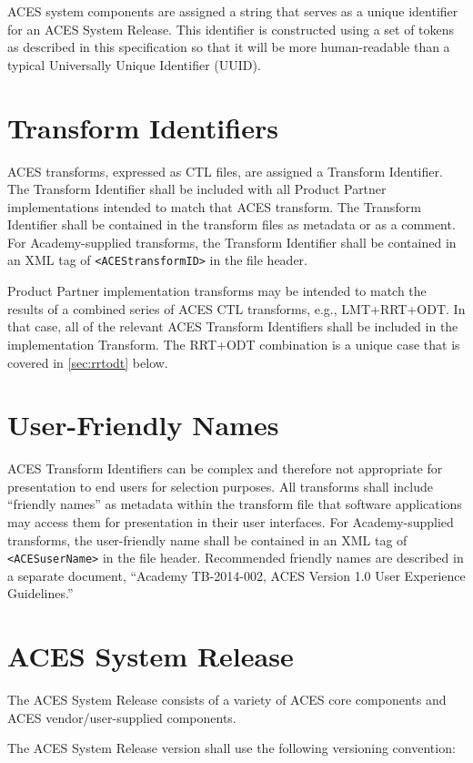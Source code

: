 ACES system components are assigned a string that serves as a unique identifier for an ACES System Release. This identifier is constructed using a set of tokens as described in this specification so that it will be more human-readable than a typical Universally Unique Identifier (UUID).

\section{Transform Identifiers}
ACES transforms, expressed as CTL files, are assigned a Transform Identifier.  The Transform Identifier shall be included with all Product Partner implementations intended to match that ACES transform. The Transform Identifier shall be contained in the transform files as metadata or as a comment. For Academy-supplied transforms, the Transform Identifier shall be contained in an XML tag of \texttt{<ACEStransformID>} in the file header.

Product Partner implementation transforms may be intended to match the results of a combined series of ACES CTL transforms, e.g., LMT+RRT+ODT.  In that case, all of the relevant ACES Transform Identifiers shall be included in the implementation Transform. The RRT+ODT combination is a unique case that is covered in \autoref{sec:rrtodt} below.

\section{User-Friendly Names}
ACES Transform Identifiers can be complex and therefore not appropriate for presentation to end users for selection purposes. All transforms shall include ``friendly names'' as metadata within the transform file that software applications may access them for presentation in their user interfaces. For Academy-supplied transforms, the user-friendly name shall be contained in an XML tag of \texttt{<ACESuserName>} in the file header. Recommended friendly names are described in a separate document, ``Academy TB-2014-002, ACES Version 1.0 User Experience Guidelines.''

\section{ACES System Release}
The ACES System Release consists of a variety of ACES core components and ACES vendor/user-supplied components.

The ACES System Release version shall use the following versioning convention: 

